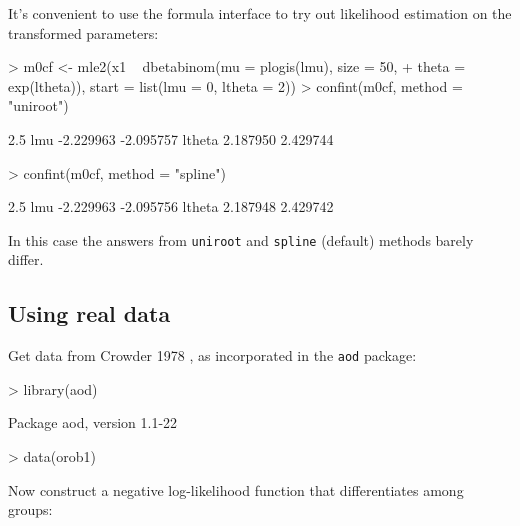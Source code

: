 \documentclass{article}
\newcommand{\code}[1]{{\tt #1}}
\begin{document}
It's convenient to use the formula interface
to try out likelihood estimation on the
transformed parameters:
\begin{Schunk}
\begin{Sinput}
> m0cf <- mle2(x1 ~ dbetabinom(mu = plogis(lmu), size = 50, 
+     theta = exp(ltheta)), start = list(lmu = 0, ltheta = 2))
> confint(m0cf, method = "uniroot")
\end{Sinput}
\begin{Soutput}
           2.5 %
lmu    -2.229963 -2.095757
ltheta  2.187950  2.429744
\end{Soutput}
\begin{Sinput}
> confint(m0cf, method = "spline")
\end{Sinput}
\begin{Soutput}
           2.5 %
lmu    -2.229963 -2.095756
ltheta  2.187948  2.429742
\end{Soutput}
\end{Schunk}

In this case the answers from \code{uniroot}
and \code{spline} (default) methods barely
differ.

\subsection{Using real data}
Get data from Crowder 1978 \cite{Crowder1978},
as incorporated in the \code{aod} package:
\begin{Schunk}
\begin{Sinput}
> library(aod)
\end{Sinput}
\begin{Soutput}
Package aod, version 1.1-22 
\end{Soutput}
\begin{Sinput}
> data(orob1)
\end{Sinput}
\end{Schunk}

Now construct a negative log-likelihood
function that differentiates among groups:
\begin{Schunk}
\end{Schunk}
\end{document}
